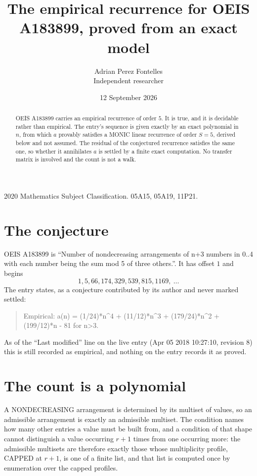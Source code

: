 \documentclass[11pt,a4paper]{article}
\title{The empirical recurrence for OEIS A183899, proved from an exact model}
\author{Adrian Perez Fontelles\\ \small Independent researcher}
\date{12 September 2026}
\theoremstyle{plain}
\theoremstyle{definition}
\begin{document}
\maketitle

\begin{abstract}
OEIS A183899 carries an empirical recurrence of order $5$. It is true, and it is
decidable rather than empirical. The entry's sequence is given exactly by an exact polynomial in $n$, from
which $a$ provably satisfies a MONIC linear recurrence of order $S=5$, derived below and not
assumed. The residual of the conjectured recurrence satisfies the same one, so whether it
annihilates $a$ is settled by a finite exact computation. No transfer matrix is involved and
the count is not a walk.
\end{abstract}

\noindent\small 2020 Mathematics Subject Classification. 05A15, 05A19, 11P21.\normalsize

\section{The conjecture}

OEIS A183899 is ``Number of nondecreasing arrangements of n+3 numbers in 0..4 with each number being the sum mod 5 of three others.''. It has offset $1$ and begins
\[
1, 5, 66, 174, 329, 539, 815, 1169,\ \dots
\]
The entry states, as a conjecture contributed by its author and never marked settled:
\begin{quote}
Empirical: a(n) = (1/24)*n\^{}4 + (11/12)*n\^{}3 + (179/24)*n\^{}2 + (199/12)*n - 81 for n>3.
\end{quote}
As of the ``Last modified'' line on the live entry (Apr 05 2018 10:27:10, revision 8)
this is still recorded as empirical, and nothing on the entry records it as proved.

\section{The count is a polynomial}

A NONDECREASING arrangement is determined by its multiset of values, so an admissible
arrangement is exactly an admissible multiset. The condition names how many other entries a
value must be built from, and a condition of that shape cannot distinguish a value occurring
$r+1$ times from one occurring more: the admissible multisets are therefore exactly those
whose multiplicity profile, CAPPED at $r+1$, is one of a finite list, and that list is computed
once by enumeration over the capped profiles.
\end{document}
